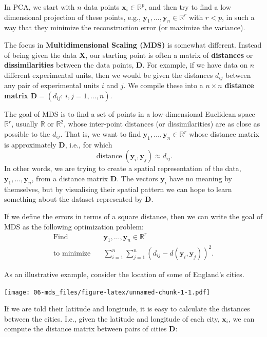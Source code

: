 \documentclass[
]{book}
\theoremstyle{definition}
\theoremstyle{definition}
\theoremstyle{definition}
\theoremstyle{definition}
\theoremstyle{remark}
\begin{document}
In PCA, we start with \(n\) data points \(\mathbf x_i \in \mathbb{R}^p\), and then try to find a low dimensional projection of these points, e.g., \(\mathbf y_1, \ldots, \mathbf y_n \in \mathbb{R}^r\) with \(r<p\), in such a way that they minimize the reconstruction error (or maximize the variance).

The focus in \textbf{Multidimensional Scaling (MDS)} is somewhat different. Instead of being given the data \(\mathbf X\), our starting point is often a matrix of \textbf{distances} or \textbf{dissimilarities} between the data points, \(\mathbf D\). For example, if we have data on \(n\) different experimental units, then we would be given the distances \(d_{ij}\) between any pair of experimental units \(i\) and \(j\). We compile these into a \(n\times n\) \textbf{distance matrix} \(\mathbf D=(d_{ij}: \, i,j=1, \ldots , n)\).

The goal of MDS is to find a set of points in a low-dimensional Euclidean space \(\mathbb{R}^r\), usually \(\mathbb{R}\) or \(\mathbb{R}^2\), whose inter-point distances (or dissimilarities) are as close as possible to the \(d_{ij}\). That is, we want to find \(\mathbf y_1, \ldots, \mathbf y_n \in \mathbb{R}^r\) whose distance matrix is approximately \(\mathbf D\), i.e., for which
\[\operatorname{distance}(\mathbf y_i, \mathbf y_j) \approx d_{ij}.\]
In other words, we are trying to create a spatial representation of the data, \(\mathbf y_1, \ldots, \mathbf y_n\), from a distance matrix \(\mathbf D\). The vectors \(\mathbf y_i\) have no meaning by themselves, but by visualising their spatial pattern we can hope to learn something about the dataset represented by \(\mathbf D\).

If we define the errors in terms of a square distance, then we can write the goal of MDS as the following optimization problem:
\begin{align}
\mbox{Find} \quad& \mathbf y_1, \ldots, \mathbf y_n \in \mathbb{R}^r\\
\mbox{to minimize} \quad &\sum_{i=1}^n \sum_{j=1}^n (d_{ij} - d(\mathbf y_i, \mathbf y_j))^2.\label{eq:mdsopt}
\end{align}

As an illustrative example, consider the location of some of England's cities.

\texttt{[image: 06-mds\_files/figure-latex/unnamed-chunk-1-1.pdf]}

If we are told their latitude and longitude, it is easy to calculate the distances between the cities. I.e., given the latitude and longitude of each city, \(\mathbf x_i\), we can compute the distance matrix between pairs of cities \(\mathbf D\):
\end{document}
